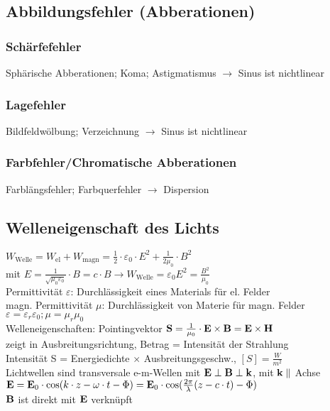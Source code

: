 \documentclass[fs, footer]{latex4ei}
\begin{document}
\begin{multicols*}{4}
\subsection{Abbildungsfehler (Abberationen)} %
\subsubsection{Schärfefehler}
Sphärische Abberationen; %
Koma; 
Astigmatismus $\rightarrow$ Sinus ist nichtlinear\\
\subsubsection{Lagefehler}
Bildfeldwölbung; 
Verzeichnung $\rightarrow$ Sinus ist nichtlinear
\subsubsection{Farbfehler/Chromatische Abberationen}
Farblängsfehler; Farbquerfehler $\rightarrow$ Dispersion\\

\subsection{Welleneigenschaft des Lichts}
$W_{\text{Welle}} = W_{\text{el}}+W_{\text{magn}} = \frac{1}{2}\cdot\varepsilon_0\cdot E^2 + \frac{1}{2\mu_0}\cdot B^2$\\
mit $E = \frac{1}{\sqrt{\mu_0\varepsilon_0}}\cdot B = c\cdot B \rightarrow W_{\text{Welle}} = \varepsilon_0E^2 = \frac{B^2}{\mu_0}$\\
Permittivität $\varepsilon$: Durchlässigkeit eines Materials für el. Felder\\
magn. Permittivität $\mu$: Durchlässigkeit von Materie für magn. Felder\\
$\varepsilon = \varepsilon_r\varepsilon_0; \mu = \mu_r\mu_0$\\

Welleneigenschaften: 
Pointingvektor $\textbf{S}=\frac{1}{\mu_0}\cdot \textbf{E} \times \textbf{B} = \textbf{E} \times \textbf{H}$ \\
zeigt in Ausbreitungsrichtung, Betrag = Intensität der Strahlung\\
Intensität S = Energiedichte $\times$ Ausbreitungsgeschw., $[S]  = \frac{W}{m^2}$\\
Lichtwellen sind transversale e-m-Wellen mit $\textbf{E}\perp \textbf{B} \perp\textbf{k}$, mit $\textbf{k} \parallel$ Achse\\
$\textbf{E} = \textbf{E}_0\cdot\cos(k\cdot z - \omega\cdot t - \Phi) = \textbf{E}_0\cdot \cos(\frac{2\pi}{\lambda}(z-c\cdot t)-\Phi)$\\
$\textbf{B}$ ist direkt mit $\textbf{E}$ verknüpft\\

\end{multicols*}
\end{document}
